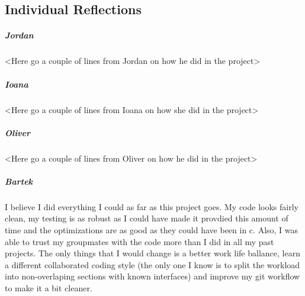 \documentclass[11pt]{article}
\begin{document}
\subsection*{Individual Reflections}
\subparagraph*{Jordan}
<Here go a couple of lines from Jordan on how he did in the project>
\subparagraph*{Ioana}
<Here go a couple of lines from Ioana on how she did in the project>
\subparagraph*{Oliver}
<Here go a couple of lines from Oliver on how he did in the project>
\subparagraph*{Bartek}
I believe I did everything I could as far as this project goes. My code looks fairly clean, my testing is as robust as I could have made it provdied this amount of time and the optimizations are as good as they could have been in c. Also, I was able to trust my groupmates with the code more than I did in all my past projects. The only things that I would change is a better work life ballance, learn a different collaborated coding style (the only one I know is to split the workload into non-overlaping sections with known interfaces) and improve my git workflow to make it a bit cleaner.
\end{document}
